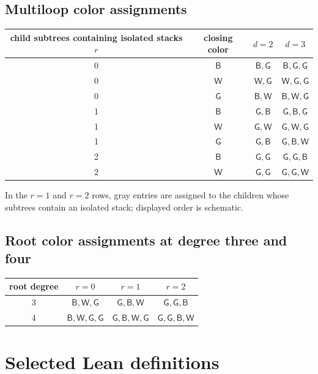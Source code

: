 \documentclass[11pt]{article}
\newcommand{\Bcol}{\mathsf{B}}
\newcommand{\Wcol}{\mathsf{W}}
\newcommand{\Gray}{\mathsf{G}}
\begin{document}
\subsection[Multiloop assignments]{Multiloop color assignments}

\begin{center}
\begin{tabular}{cccc}
\toprule
child subtrees containing isolated stacks $r$ & closing color & $d=2$ & $d=3$ \\
\midrule
0 & $\Bcol$ & $\Bcol,\Gray$ & $\Bcol,\Gray,\Gray$ \\
0 & $\Wcol$ & $\Wcol,\Gray$ & $\Wcol,\Gray,\Gray$ \\
0 & $\Gray$ & $\Bcol,\Wcol$ & $\Bcol,\Wcol,\Gray$ \\
\midrule
1 & $\Bcol$ & $\Gray,\Bcol$ & $\Gray,\Bcol,\Gray$ \\
1 & $\Wcol$ & $\Gray,\Wcol$ & $\Gray,\Wcol,\Gray$ \\
1 & $\Gray$ & $\Gray,\Bcol$ & $\Gray,\Bcol,\Wcol$ \\
\midrule
2 & $\Bcol$ & $\Gray,\Gray$ & $\Gray,\Gray,\Bcol$ \\
2 & $\Wcol$ & $\Gray,\Gray$ & $\Gray,\Gray,\Wcol$ \\
\bottomrule
\end{tabular}
\end{center}
In the $r=1$ and $r=2$ rows, gray entries are assigned to the children whose subtrees contain an isolated stack; displayed order is schematic.

\subsection{Root color assignments at degree three and four}

\begin{center}
\begin{tabular}{cccc}
\toprule
root degree & $r=0$ & $r=1$ & $r=2$ \\
\midrule
3 & $\Bcol,\Wcol,\Gray$ & $\Gray,\Bcol,\Wcol$ & $\Gray,\Gray,\Bcol$ \\
4 & $\Bcol,\Wcol,\Gray,\Gray$ & $\Gray,\Bcol,\Wcol,\Gray$ & $\Gray,\Gray,\Bcol,\Wcol$ \\
\bottomrule
\end{tabular}
\end{center}

\section{Selected Lean definitions}
\label{app:lean}
\end{document}
